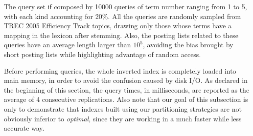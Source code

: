 \documentclass[runningheads,a4paper]{llncs}
\begin{document}
The query set if composed by 10000 queries of term number ranging from 1 to 5, with each kind accounting for 20\%.
All the queries are randomly sampled from TREC 2005 Efficiency Track topics, drawing only those whose terms have a mapping in the lexicon after stemming.
Also, the posting lists related to these queries have an average length larger than $ 10^5 $, avoiding the bias brought by short posting lists while highlighting advantage of random access.

Before performing queries, the whole inverted index is completely loaded into main memory, in order to avoid the confusion caused by disk I/O.
As declared in the beginning of this section, the query times, in milliseconds, are reported as the average of 4 consecutive replications.
Also note that our goal of this subsection is only to demonstrate that indexes built using our partitioning strategies are not obviously inferior to \textit{optimal}, since they are working in a much faster while less accurate way.
\end{document}
